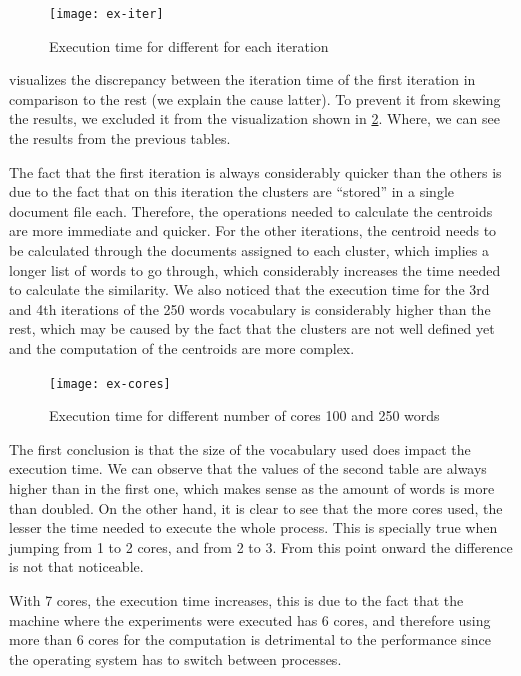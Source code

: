 \begin{figure}[H]
    \texttt{[image: ex-iter]}
    \caption{Execution time for different for each iteration}%
    \label{fig:time-iter}%
\end{figure}

 visualizes the discrepancy between the iteration time of the first
iteration in comparison to the rest (we explain the cause latter).
To prevent it from skewing the results, we excluded it from the visualization
shown in \cref{fig:time-cores}. Where, we can see the results from the previous
tables.

The fact that the first iteration is always considerably quicker than the
others is due to the fact that on this iteration the clusters are
``stored'' in a single document file each. Therefore, the operations needed to calculate
the centroids are more immediate and quicker. For the other iterations, the
centroid needs to be calculated through the documents assigned to each cluster,
which implies a longer list of words to go through, which considerably increases
the time needed to calculate the similarity. We also noticed that the execution
time for the 3rd and 4th iterations of the 250 words vocabulary is considerably
higher than the rest, which may be caused by the fact that the clusters are not
well defined yet and the computation of the centroids are more complex.

\begin{figure}[H]
    \texttt{[image: ex-cores]}
    \caption{Execution time for different number of cores 100 and 250 words}%
    \label{fig:time-cores}%
\end{figure}

The first conclusion is that the size of the vocabulary used does impact the
execution time. We can observe that the values of the second table are always
higher than in the first one, which makes sense as the amount of words is more
than doubled. On the other hand, it is clear to see that the more cores used,
the lesser the time needed to execute the whole process. This is specially true
when jumping from 1 to 2 cores, and from 2 to 3. From this point onward the
difference is not that noticeable.

With 7 cores, the execution time increases, this is due to the fact that
the machine where the experiments were executed has 6 cores, and therefore
using more than 6 cores for the computation is detrimental to the performance
since the operating system has to switch between processes.

